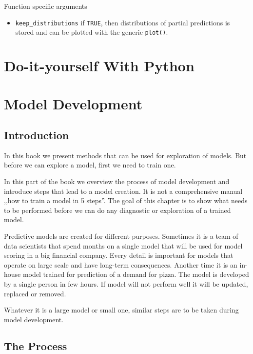 \documentclass[12pt,]{krantz}
\providecommand{\tightlist}{%
  \setlength{\itemsep}{0pt}\setlength{\parskip}{0pt}}
\begin{document}
Function specific arguments

\begin{itemize}
\tightlist
\item
  \texttt{keep\_distributions} if \texttt{TRUE}, then distributions of partial predictions is stored and can be plotted with the generic \texttt{plot()}.
\end{itemize}

\hypertarget{doItYourselfWithPython}{%
\section{Do-it-yourself With Python}\label{doItYourselfWithPython}}

\hypertarget{modelDevelopmentProcess}{%
\section{Model Development}\label{modelDevelopmentProcess}}

\hypertarget{MDPIntro}{%
\subsection{Introduction}\label{MDPIntro}}

In this book we present methods that can be used for exploration of models. But before we can explore a model, first we need to train one.

In this part of the book we overview the process of model development and introduce steps that lead to a model creation. It is not a comprehensive manual ,,how to train a model in 5 steps''. The goal of this chapter is to show what needs to be performed before we can do any diagnostic or exploration of a trained model.

Predictive models are created for different purposes. Sometimes it is a team of data scientists that spend months on a single model that will be used for model scoring in a big financial company. Every detail is important for models that operate on large scale and have long-term consequences. Another time it is an in-house model trained for prediction of a demand for pizza. The model is developed by a single person in few hours. If model will not perform well it will be updated, replaced or removed.

Whatever it is a large model or small one, similar steps are to be taken during model development.

\hypertarget{the-process}{%
\subsection{The Process}\label{the-process}}
\end{document}
